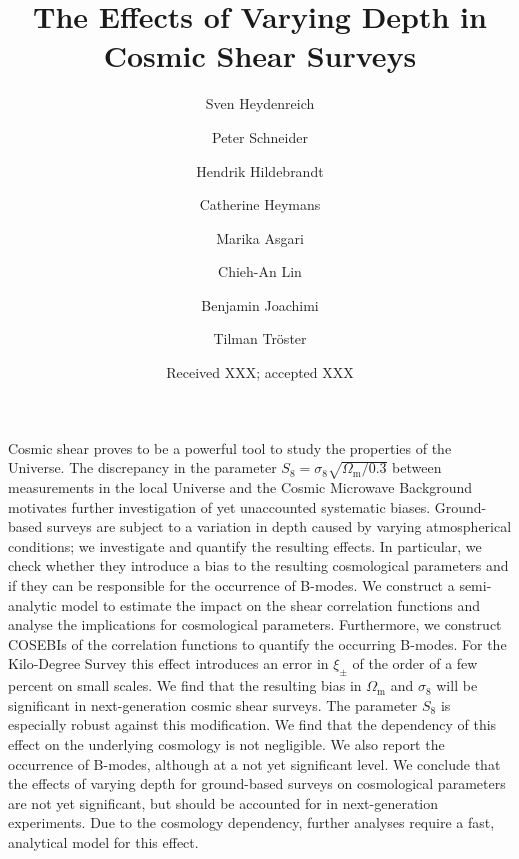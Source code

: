 \documentclass[referee]{aa} %
\renewcommand{\[}{\begin{equation}}
\renewcommand{\]}{\end{equation}}
\renewcommand{\rm}{\mathrm}
\begin{document}
 


   \title{The Effects of Varying Depth in Cosmic Shear Surveys}


   \author{Sven Heydenreich%
          \and Peter Schneider 
          \and Hendrik Hildebrandt
          \and Catherine Heymans 
          \and Marika Asgari
          \and Chieh-An Lin
          \and Benjamin Joachimi
          \and Tilman Tr\"{o}ster
          }

   \date{Received XXX; accepted XXX}

  \abstract
   {Cosmic shear proves to be a powerful tool to study the properties of the Universe. The discrepancy in the parameter $S_8 = \sigma_8\sqrt{\Omega_{\rm{m}}/0.3}$ between measurements in the local Universe and the Cosmic Microwave Background motivates further investigation of yet unaccounted systematic biases. 
   Ground-based surveys are subject to a variation in depth caused by varying atmospherical conditions; we investigate and quantify the resulting effects. In particular, we check whether they introduce a bias to the resulting cosmological parameters and if they can be responsible for the occurrence of B-modes.
   We construct a semi-analytic model to estimate the impact on the shear correlation functions and analyse the implications for cosmological parameters. Furthermore, we construct COSEBIs of the correlation functions to quantify the occurring B-modes.
   For the Kilo-Degree Survey this effect introduces an error in $\xi_\pm$ of the order of a few percent on small scales. We find that the resulting bias in $\Omega_{\rm m}$ and $\sigma_8$ will be significant in next-generation cosmic shear surveys. The parameter $S_8$ is especially robust against this modification. We find that the dependency of this effect on the underlying cosmology is not negligible. We also report the occurrence of B-modes, although at a not yet significant level.
   We conclude that the effects of varying depth for ground-based surveys on cosmological parameters are not yet significant, but should be accounted for in next-generation experiments. Due to the cosmology dependency, further analyses require a fast, analytical model for this effect.}
\end{document}
